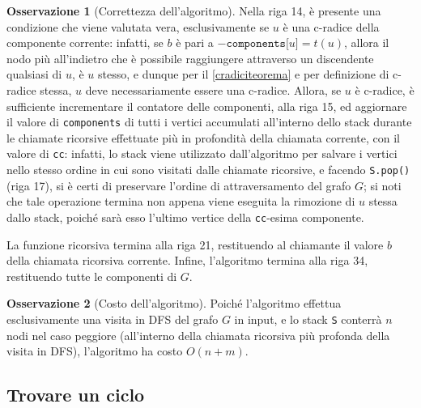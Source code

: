 \documentclass[14pt]{extreport}
\theoremstyle{definition}
\theoremstyle{definition}
\newtheorem{remark}{Osservazione}[subsection]
\begin{document}
\begin{remark}[Correttezza dell'algoritmo]
    Nella riga 14, è presente una condizione che viene valutata vera, esclusivamente se $u$ è una c-radice della componente corrente: infatti, se $b$ è pari a $-\texttt{components[}u\texttt{]} = t(u)$, allora il nodo più all'indietro che è possibile raggiungere attraverso un discendente qualsiasi di $u$, è $u$ stesso, e dunque per il \cref{cradiciteorema} e per definizione di c-radice stessa, $u$ deve necessariamente essere una c-radice. Allora, se $u$ è c-radice, è sufficiente incrementare il contatore delle componenti, alla riga 15, ed aggiornare il valore di \texttt{components} di tutti i vertici accumulati all'interno dello stack durante le chiamate ricorsive effettuate più in profondità della chiamata corrente, con il valore di \texttt{cc}: infatti, lo stack viene utilizzato dall'algoritmo per salvare i vertici nello stesso ordine in cui sono visitati dalle chiamate ricorsive, e facendo \texttt{S.pop()} (riga 17), si è certi di preservare l'ordine di attraversamento del grafo $G$; si noti che tale operazione termina non appena viene eseguita la rimozione di $u$ stessa dallo stack, poiché sarà esso l'ultimo vertice della \texttt{cc}-esima componente.

    La funzione ricorsiva termina alla riga 21, restituendo al chiamante il valore $b$ della chiamata ricorsiva corrente. Infine, l'algoritmo termina alla riga 34, restituendo tutte le componenti di $G$.
\end{remark}

\begin{remark}[Costo dell'algoritmo]
    Poiché l'algoritmo effettua esclusivamente una visita in DFS del grafo $G$ in input, e lo stack \texttt{S} conterrà $n$ nodi nel caso peggiore (all'interno della chiamata ricorsiva più profonda della visita in DFS), l'algoritmo ha costo $O(n + m)$.
\end{remark}

\subsection{Trovare un ciclo}
\end{document}
